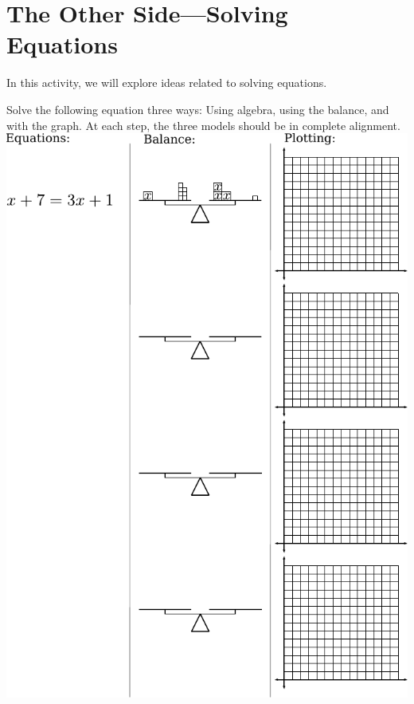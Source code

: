 \newpage
\section{The Other Side---Solving Equations}\label{A:otherSide}


In this activity, we will explore ideas related to solving equations.


\begin{prob}
Solve the following equation three ways: Using algebra, using the
balance, and with the graph. At each step, the three models should be in
complete alignment.
\[
\]\includegraphics[scale=0.8]{../graphics/eqBalGraph.pdf}

\end{prob}

